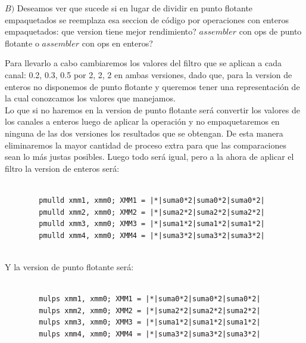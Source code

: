 $B)$ Deseamos ver que sucede si en lugar de dividir en punto flotante empaquetados se reemplaza esa seccion de código por operaciones con enteros empaquetados: que version tiene mejor rendimiento? $assembler$ con ops de punto flotante o $assembler$ con ops en enteros?

Para llevarlo a cabo cambiaremos los valores del filtro que se aplican a cada canal: 0.2, 0.3, 0.5 por 2, 2, 2 en ambas versiones, dado que, para la version de enteros no disponemos de punto flotante y queremos tener una representación de la cual conozcamos los valores que manejamos.\\
Lo que si no haremos en la version de punto flotante será convertir los valores de los canales a enteros luego de aplicar la operación y no empaquetaremos en ninguna de las dos versiones los resultados que se obtengan. De esta manera eliminaremos la mayor cantidad de proceso extra para que las comparaciones sean lo más justas posibles.  
Luego todo será igual, pero a la ahora de aplicar el filtro la version de enteros será:\\

\begin{codesnippet}
\begin{verbatim}
                
		pmulld xmm1, xmm0; XMM1 = |*|suma0*2|suma0*2|suma0*2|  
		pmulld xmm2, xmm0; XMM2 = |*|suma2*2|suma2*2|suma2*2|  
		pmulld xmm3, xmm0; XMM3 = |*|suma1*2|suma1*2|suma1*2|   
		pmulld xmm4, xmm0; XMM4 = |*|suma3*2|suma3*2|suma3*2|   
                
\end{verbatim}
\end{codesnippet}

Y la version de punto flotante será:

\begin{codesnippet}
\begin{verbatim}

		mulps xmm1, xmm0; XMM1 = |*|suma0*2|suma0*2|suma0*2|  
		mulps xmm2, xmm0; XMM2 = |*|suma2*2|suma2*2|suma2*2|  
		mulps xmm3, xmm0; XMM3 = |*|suma1*2|suma1*2|suma1*2|  
		mulps xmm4, xmm0; XMM4 = |*|suma3*2|suma3*2|suma3*2|     

\end{verbatim}
\end{codesnippet}
